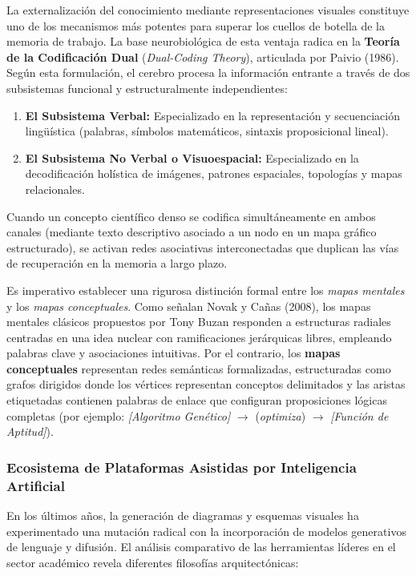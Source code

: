 La externalización del conocimiento mediante representaciones visuales constituye uno de los mecanismos más potentes para superar los cuellos de botella de la memoria de trabajo. La base neurobiológica de esta ventaja radica en la \textbf{Teoría de la Codificación Dual} (\textit{Dual-Coding Theory}), articulada por Paivio (1986). Según esta formulación, el cerebro procesa la información entrante a través de dos subsistemas funcional y estructuralmente independientes:

\begin{enumerate}
    \item \textbf{El Subsistema Verbal:} Especializado en la representación y secuenciación lingüística (palabras, símbolos matemáticos, sintaxis proposicional lineal).
    \item \textbf{El Subsistema No Verbal o Visuoespacial:} Especializado en la decodificación holística de imágenes, patrones espaciales, topologías y mapas relacionales.
\end{enumerate}

Cuando un concepto científico denso se codifica simultáneamente en ambos canales (mediante texto descriptivo asociado a un nodo en un mapa gráfico estructurado), se activan redes asociativas interconectadas que duplican las vías de recuperación en la memoria a largo plazo.

Es imperativo establecer una rigurosa distinción formal entre los \textit{mapas mentales} y los \textit{mapas conceptuales}. Como señalan Novak y Cañas (2008), los mapas mentales clásicos propuestos por Tony Buzan responden a estructuras radiales centradas en una idea nuclear con ramificaciones jerárquicas libres, empleando palabras clave y asociaciones intuitivas. Por el contrario, los \textbf{mapas conceptuales} representan redes semánticas formalizadas, estructuradas como grafos dirigidos donde los vértices representan conceptos delimitados y las aristas etiquetadas contienen palabras de enlace que configuran proposiciones lógicas completas (por ejemplo: \textit{[Algoritmo Genético]} $\to$ (\textit{optimiza}) $\to$ \textit{[Función de Aptitud]}).

\subsubsection{Ecosistema de Plataformas Asistidas por Inteligencia Artificial}

En los últimos años, la generación de diagramas y esquemas visuales ha experimentado una mutación radical con la incorporación de modelos generativos de lenguaje y difusión. El análisis comparativo de las herramientas líderes en el sector académico revela diferentes filosofías arquitectónicas:

